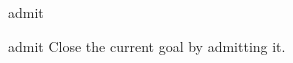 \begin{tactic}{admit}
  \begin{tsyntax}[empty]{admit}
  Close the current goal by admitting it.
  \end{tsyntax}
\end{tactic}
